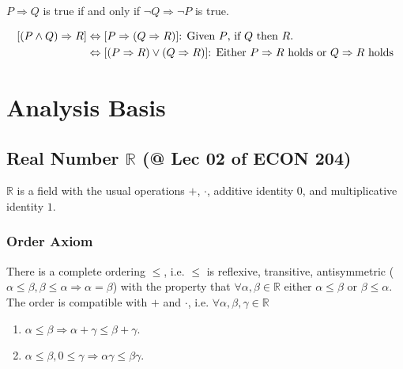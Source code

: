 \documentclass[11pt]{elegantbook}
\begin{document}
\begin{theorem}
\normalfont
$P \Rightarrow Q$ is true if and only if $\lnot Q \Rightarrow \lnot P$ is true.
\end{theorem}

\begin{proposition}
    \begin{equation}
        \begin{aligned}
            [(P\wedge Q) \Rightarrow R]&\Leftrightarrow [P \Rightarrow (Q \Rightarrow R)]\textnormal{: Given $P$, if $Q$ then $R$.}\\
            &\Leftrightarrow [(P \Rightarrow R)\vee(Q \Rightarrow R)]\textnormal{: Either $P \Rightarrow R$ holds or $Q \Rightarrow R$ holds}
        \end{aligned}
        \nonumber
    \end{equation}
\end{proposition}



\chapter{Analysis Basis}
\section{Real Number $\mathbb{R}$ \small{(@ Lec 02 of ECON 204)}}
$\mathbb{R}$ is a field with the usual operations $+$, $\cdot$, additive identity $0$, and multiplicative identity $1$.
\subsection{Order Axiom}
\begin{proposition}
    \normalfont
    There is a complete ordering $\leq$, i.e. $\leq$ is reflexive, transitive, antisymmetric ($\alpha\leq\beta,\beta\leq\alpha \Rightarrow \alpha=\beta$) with the property that $\forall \alpha,\beta\in \mathbb{R}$ either $\alpha\leq\beta$ or $\beta\leq \alpha$.\\
    The order is compatible with $+$ and $\cdot$, i.e. $\forall \alpha,\beta,\gamma\in \mathbb{R}$
    \begin{enumerate}
        \item $\alpha\leq\beta \Rightarrow \alpha+\gamma\leq\beta+\gamma$.
        \item $\alpha\leq\beta,0\leq\gamma \Rightarrow \alpha\gamma\leq\beta\gamma$.
    \end{enumerate}
\end{proposition}
\end{document}
